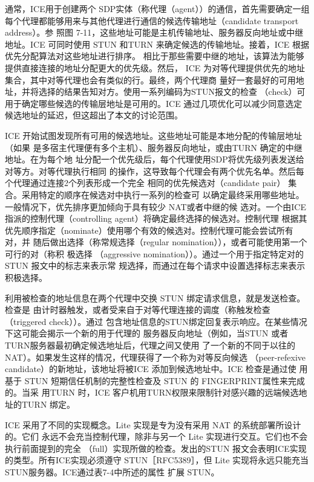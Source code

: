 通常，ICE用于创建两个 SDP实体（称代理（agent））的通信，首先需要确定一组
每个代理都能够用来与其他代理进行通信的候选传输地址（candidate transport address）。参
照图 7-11，这些地址可能是主机传输地址、服务器反向地址或中继地址。ICE 可同时使用
STUN 和TURN 来确定候选的传输地址。接着，ICE 根据优先分配算法对这些地址进行排序。
相比于那些需要中继的地址，该算法为能够提供直接连接的地址分配更大的优先级。然后，
ICE 为对等代理提供优先的地址集合，其中对等代理也会有类似的行。最终，两个代理商
量好一套最好的可用地址，并将选择的结果告知对方。使用一系列编码为STUN报文的检查
（check）可用于确定哪些候选的传输层地址是可用的。ICE 通过几项优化可以减少同意选定
候选地址的延迟，但这超出了本文的讨论范围。

ICE 开始试图发现所有可用的候选地址。这些地址可能是本地分配的传输层地址（如果
是多宿主代理便有多个主机）、服务器反向地址，或由TURN 确定的中继地址。在为每个地
址分配一个优先级后，每个代理使用SDP将优先级列表发送给对等方。对等代理执行相同
的操作，这导致每个代理会有两个优先名单。然后每个代理通过连接2个列表形成一个完全
相同的优先候选对（candidate pair） 集合。采用特定的顺序在候选对中执行一系列的检查可
以确定最终采用哪些地址。一般情况下，优先排序更加倾向于具有较少 NAT或者中继的候
选对。一个由ICE 指派的控制代理（controlling agent）将确定最终选择的候选对。控制代理
根据其优先顺序指定（nominate）使用哪个有效的候选对。控制代理可能会尝试所有对，并
随后做出选择（称常规选择（regular nomination）），或者可能使用第一个可行的对（称积
极选择 （aggressive nomination））。通过一个用于指定特定对的STUN 报文中的标志来表示常
规选择，而通过在每个请求中设置选择标志来表示积极选择。

利用被检查的地址信息在两个代理中交换 STUN 绑定请求信息，就是发送检查。检查是
由计时器触发，或者受来自于对等代理连接的调度（称触发检查（triggered check））。通过
包含地址信息的STUN绑定回复表示响应。在某些情况下这可能会揭示一个新的用于代理的
服务器反向地址（例如，当STUN 或者 TURN服务器最初确定候选地址后，代理之间又使用
了一个新的不同于以往的NAT）。如果发生这样的情况，代理获得了一个称为对等反向候选
（peer-refexive candidate）的新地址，该地址将被ICE 添加到候选地址中。ICE 检查是通过使
用基于 STUN 短期信任机制的完整性检查及 STUN 的 FINGERPRINT属性来完成的。当采
用TURN 时，ICE 客户机用TURN权限来限制针对感兴趣的远端候选地址的TURN 绑定。

ICE 采用了不同的实现概念。Lite 实现是专为没有采用 NAT 的系统部署所设计的。它们
永远不会充当控制代理，除非与另一个 Lite 实现进行交互。它们也不会执行前面提到的完全
（full）实现所做的检查。发出的STUN 报文会表明ICE实现的类型。所有ICE实现必须遵守
STUN［RFC5389］，但 Lite 实现将永远只能充当STUN服务器。ICE通过表7-4中所述的属性
扩展 STUN。

